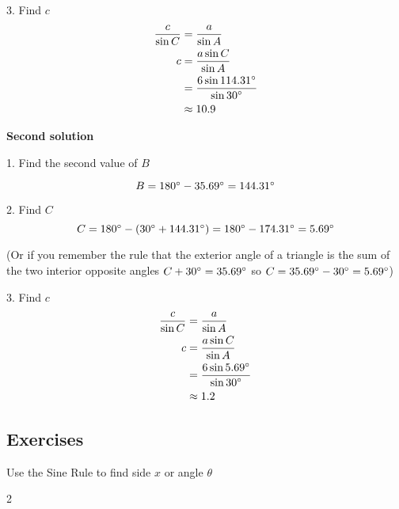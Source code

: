3. Find $c$
\begin{align*}\frac{c}{\sin  C} &  = \frac{a}{\sin  A} \\
c &  = \frac{a \sin  C}{\sin  A} \\
 &  = \frac{6 \sin  114.31 \mbox{{\ensuremath{{}^\circ}}}}{\sin  30 \mbox{{\ensuremath{{}^\circ}}}} \\
 &  \approx   10.9\end{align*}

\textbf{Second solution} 

1. Find the second value of $B$ 

\begin{equation*}B =180 \mbox{{\ensuremath{{}^\circ}}} -35.69 \mbox{{\ensuremath{{}^\circ}}} =144.31 \mbox{{\ensuremath{{}^\circ}}}
\end{equation*}

2. Find $C$
\begin{equation*}C =180 \mbox{{\ensuremath{{}^\circ}}} -(30 \mbox{{\ensuremath{{}^\circ}}} +144.31 \mbox{{\ensuremath{{}^\circ}}}) =180 \mbox{{\ensuremath{{}^\circ}}} -174.31 \mbox{{\ensuremath{{}^\circ}}} =5.69 \mbox{{\ensuremath{{}^\circ}}}
\end{equation*}

(Or if you remember the rule that the exterior angle of a triangle is the sum of the two interior
opposite angles $C +30 \mbox{{\ensuremath{{}^\circ}}} =35.69 \mbox{{\ensuremath{{}^\circ}}}$ so $C =35.69 \mbox{{\ensuremath{{}^\circ}}} -30 \mbox{{\ensuremath{{}^\circ}}} =5.69 \mbox{{\ensuremath{{}^\circ}}}$) 

3. Find $c$
\begin{align*}\frac{c}{\sin  C} &  = \frac{a}{\sin  A} \\
c &  = \frac{a \sin  C}{\sin  A} \\
 &  = \frac{6 \sin  5.69 \mbox{{\ensuremath{{}^\circ}}}}{\sin  30 \mbox{{\ensuremath{{}^\circ}}}} \\
 &  \approx   1.2\end{align*}



\subsection{Exercises}

Use the Sine Rule to find side $x$ or angle $\theta $  
\columnsep =30pt
\begin {multicols}{2}
 


\end {multicols}




